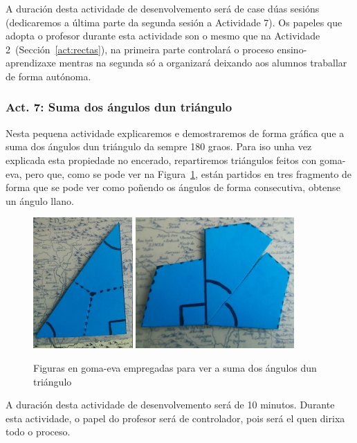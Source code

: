 A duración desta actividade de desenvolvemento será de case dúas sesións (dedicaremos a última parte da segunda sesión a Actividade 7). Os papeles que adopta o profesor durante esta actividade son o mesmo que na Actividade 2~(Sección~\ref{act:rectas}), na primeira parte controlará o proceso ensino-aprendizaxe mentras na segunda só a organizará deixando aos alumnos traballar de forma autónoma.

\subsubsection{Act. 7: Suma dos ángulos dun triángulo}\label{act:sumangulos}
Nesta pequena actividade explicaremos e demostraremos de forma gráfica que a suma dos ángulos dun triángulo da sempre 180 graos. Para iso unha vez explicada esta propiedade no encerado, repartiremos triángulos feitos con goma-eva, pero que, como se pode ver na Figura~\ref{fig:act11}, están partidos en tres fragmento de forma que se pode ver como poñendo os ángulos de forma consecutiva, obtense un ángulo llano.

\begin{figure}[h!]
  \centering
  \includegraphics[height=5cm]{img/180grados-2.png}
  \includegraphics[height=5cm]{img/180grados-1.png}
  \caption{Figuras en goma-eva empregadas para ver a suma dos ángulos dun triángulo}\label{fig:act11}
\end{figure}

A duración desta actividade de desenvolvemento será de 10 minutos. Durante esta actividade, o papel do profesor será de controlador, pois será el quen dirixa todo o proceso.


